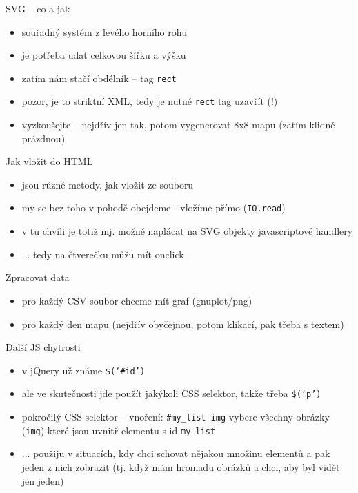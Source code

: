 \documentclass{beamer}
\begin{document}
\begin{frame}{SVG -- co a jak}
  \begin{itemize}
    \item souřadný systém z levého horního rohu
    \item je potřeba udat celkovou šířku a výšku
    \item zatím nám stačí obdélník -- tag \texttt{rect}
    \item pozor, je to striktní XML, tedy je nutné \texttt{rect} tag uzavřít (!)
    \item vyzkoušejte -- nejdřív jen tak, potom vygenerovat 8x8 mapu (zatím klidně prázdnou)
  \end{itemize}
\end{frame}

\begin{frame}{Jak vložit do HTML}
  \begin{itemize}
    \item jsou různé metody, jak vložit ze souboru
    \item my se bez toho v pohodě obejdeme - vložíme přímo (\texttt{IO.read})
    \item v tu chvíli je totiž mj. možné naplácat na SVG objekty javascriptové handlery
    \item ... tedy na čtverečku můžu mít onclick
  \end{itemize}
\end{frame}

\begin{frame}{Zpracovat data}
  \begin{itemize}
    \item pro každý CSV soubor chceme mít graf (gnuplot/png)
    \item pro každý den mapu (nejdřív obyčejnou, potom klikací, pak třeba s textem)
  \end{itemize}
\end{frame}

\begin{frame}{Další JS chytrosti}
  \begin{itemize}
    \item v jQuery už známe \texttt{\$(`\#id')}
    \item ale ve skutečnosti jde použít jakýkoli CSS selektor, takže třeba \texttt{\$(`p')}
    \item pokročilý CSS selektor -- vnoření: \texttt{\#my\_list img} vybere všechny obrázky (\texttt{img}) které jsou uvnitř elementu s id \texttt{my\_list}
    \item ... použiju v situacích, kdy chci schovat nějakou množinu elementů a pak jeden z nich zobrazit (tj. když mám hromadu obrázků a chci, aby byl vidět jen jeden)
  \end{itemize}
\end{frame}
\end{document}
